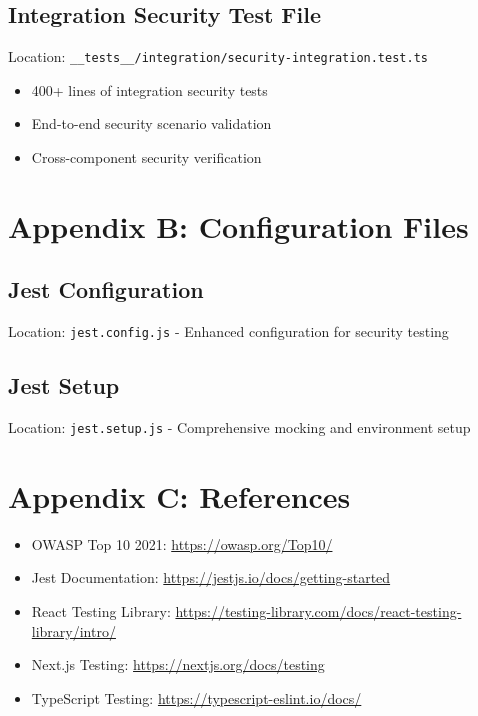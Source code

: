 \documentclass[12pt]{article}
\begin{document}
\subsection{Integration Security Test File}
Location: \texttt{\_\_tests\_\_/integration/security-integration.test.ts}
\begin{itemize}
    \item 400+ lines of integration security tests
    \item End-to-end security scenario validation
    \item Cross-component security verification
\end{itemize}

\section{Appendix B: Configuration Files}

\subsection{Jest Configuration}
Location: \texttt{jest.config.js} - Enhanced configuration for security testing

\subsection{Jest Setup}
Location: \texttt{jest.setup.js} - Comprehensive mocking and environment setup

\section{Appendix C: References}

\begin{itemize}
    \item OWASP Top 10 2021: \url{https://owasp.org/Top10/}
    \item Jest Documentation: \url{https://jestjs.io/docs/getting-started}
    \item React Testing Library: \url{https://testing-library.com/docs/react-testing-library/intro/}
    \item Next.js Testing: \url{https://nextjs.org/docs/testing}
    \item TypeScript Testing: \url{https://typescript-eslint.io/docs/}
\end{itemize}
\end{document}
